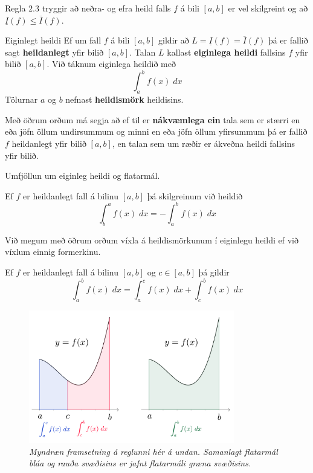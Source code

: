 \begin{ath}
Regla $2.3$ tryggir að neðra- og efra heild falls $f$ á bili $[a,b]$ er vel skilgreint og að $\underline{I}(f) \leq \overline{I}(f)$.
\end{ath}

\begin{skilgr}{Eiginlegt heildi}
Ef um fall $f$ á bili $[a,b]$ gildir að $L = \underline{I}(f) = \overline{I}(f)$ þá er fallið sagt \textbf{heildanlegt} yfir bilið $[a,b]$. Talan $L$ kallast \textbf{eiginlega heildi} fallsins $f$ yfir bilið $[a,b]$. Við táknum eiginlega heildið með
$$
\int_{a}^{b} f(x)\;dx
$$
Tölurnar $a$ og $b$ nefnast \textbf{heildismörk} heildisins.
\end{skilgr}

\begin{ath}
Með öðrum orðum má segja að ef til er \textbf{nákvæmlega ein} tala sem er stærri en eða jöfn öllum undirsummum og minni en eða jöfn öllum yfirsummum þá er fallið $f$ heildanlegt yfir bilið $[a,b]$, en talan sem um ræðir er ákveðna heildi fallsins yfir bilið.
\end{ath}

\begin{ath}
Umfjöllun um eiginleg heildi og flatarmál.
\end{ath}

\begin{skilgr}{}
Ef $f$ er heildanlegt fall á bilinu $[a,b]$ þá skilgreinum við heildið
$$
\int_{b}^{a} f(x) \; dx = -\int_{a}^{b} f(x) \; dx
$$
\end{skilgr}

\begin{ath}
Við megum með öðrum orðum víxla á heildismörkunum í eiginlegu heildi ef við víxlum einnig formerkinu.
\end{ath}

\begin{regla}{}
Ef $f$ er heildanlegt fall á bilinu $[a,b]$ og $c \in [a,b]$ þá gildir
$$
\int_{a}^{b} f(x) \; dx = \int_{a}^{c} f(x) \; dx + \int_{c}^{b} f(x) \; dx
$$
\end{regla}

\begin{monnun}
\begin{figure}[h]
\center
\includegraphics[width=0.8\textwidth]{Pictures/k2m5.png}
\caption{\it Myndræn framsetning á reglunni hér á undan. Samanlagt flatarmál bláa og rauða svæðisins er jafnt flatarmáli græna svæðisins.}
\end{figure}

\end{monnun}

